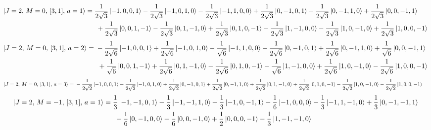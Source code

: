 \documentclass{article}
\begin{document}
{\small
\begin{equation*}
\begin{aligned}
\ket{J=2,\,M=0,\,[3,1],\,a=1} = \; &\frac{1}{2\sqrt{3}} \ket{-1,0,0,1} - \frac{1}{2\sqrt{3}} \ket{-1,0,1,0} - \frac{1}{2\sqrt{3}} \ket{-1,1,0,0} + \frac{1}{2\sqrt{3}} \ket{0,-1,0,1} - \frac{1}{2\sqrt{3}} \ket{0,-1,1,0} + \frac{1}{2\sqrt{3}} \ket{0,0,-1,1} \\
  & \; + \frac{1}{2\sqrt{3}} \ket{0,0,1,-1} - \frac{1}{2\sqrt{3}} \ket{0,1,-1,0} + \frac{1}{2\sqrt{3}} \ket{0,1,0,-1} - \frac{1}{2\sqrt{3}} \ket{1,-1,0,0} - \frac{1}{2\sqrt{3}} \ket{1,0,-1,0} + \frac{1}{2\sqrt{3}} \ket{1,0,0,-1}
\end{aligned}
\end{equation*}}
{\small
\begin{equation*}
\begin{aligned}
\ket{J=2,\,M=0,\,[3,1],\,a=2} = \; &- \frac{1}{2\sqrt{6}} \ket{-1,0,0,1} + \frac{1}{2\sqrt{6}} \ket{-1,0,1,0} - \frac{1}{\sqrt{6}} \ket{-1,1,0,0} - \frac{1}{2\sqrt{6}} \ket{0,-1,0,1} + \frac{1}{2\sqrt{6}} \ket{0,-1,1,0} + \frac{1}{\sqrt{6}} \ket{0,0,-1,1} \\
  & \; + \frac{1}{\sqrt{6}} \ket{0,0,1,-1} + \frac{1}{2\sqrt{6}} \ket{0,1,-1,0} - \frac{1}{2\sqrt{6}} \ket{0,1,0,-1} - \frac{1}{\sqrt{6}} \ket{1,-1,0,0} + \frac{1}{2\sqrt{6}} \ket{1,0,-1,0} - \frac{1}{2\sqrt{6}} \ket{1,0,0,-1}
\end{aligned}
\end{equation*}}
\begin{equation*}
\begin{aligned}
\ket{J=2,\,M=0,\,[3,1],\,a=3} = \; &- \frac{1}{2\sqrt{2}} \ket{-1,0,0,1} - \frac{1}{2\sqrt{2}} \ket{-1,0,1,0} + \frac{1}{2\sqrt{2}} \ket{0,-1,0,1} + \frac{1}{2\sqrt{2}} \ket{0,-1,1,0} + \frac{1}{2\sqrt{2}} \ket{0,1,-1,0} + \frac{1}{2\sqrt{2}} \ket{0,1,0,-1} - \frac{1}{2\sqrt{2}} \ket{1,0,-1,0} - \frac{1}{2\sqrt{2}} \ket{1,0,0,-1}
\end{aligned}
\end{equation*}
{\small
\begin{equation*}
\begin{aligned}
\ket{J=2,\,M=-1,\,[3,1],\,a=1} = \; &\frac{1}{3} \ket{-1,-1,0,1} - \frac{1}{3} \ket{-1,-1,1,0} + \frac{1}{3} \ket{-1,0,-1,1} - \frac{1}{6} \ket{-1,0,0,0} - \frac{1}{3} \ket{-1,1,-1,0} + \frac{1}{3} \ket{0,-1,-1,1} \\
  & \; - \frac{1}{6} \ket{0,-1,0,0} - \frac{1}{6} \ket{0,0,-1,0} + \frac{1}{2} \ket{0,0,0,-1} - \frac{1}{3} \ket{1,-1,-1,0}
\end{aligned}
\end{equation*}}
\end{document}
